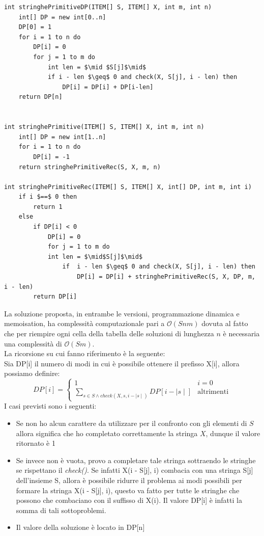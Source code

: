 \documentclass[../cheatSheetAlgoritmi.tex]{subfiles}
\begin{document}
\begin{lstlisting}[caption=Stringhe primitive]
int stringhePrimitiveDP(ITEM[] S, ITEM[] X, int m, int n)
	int[] DP = new int[0..n]
	DP[0] = 1
	for i = 1 to n do
		DP[i] = 0
		for j = 1 to m do
			int len = $\mid $S[j]$\mid$
			if i - len $\geq$ 0 and check(X, S[j], i - len) then
				DP[i] = DP[i] + DP[i-len]
	return DP[n]


int stringhePrimitive(ITEM[] S, ITEM[] X, int m, int n)
	int[] DP = new int[1..n]
	for i = 1 to n do
		DP[i] = -1
	return stringhePrimitiveRec(S, X, m, n)

int stringhePrimitiveRec(ITEM[] S, ITEM[] X, int[] DP, int m, int i)
	if i $==$ 0 then
		return 1
	else
		if DP[i] < 0 
			DP[i] = 0
			for j = 1 to m do
			int len = $\mid$S[j]$\mid$
				if  i - len $\geq$ 0 and check(X, S[j], i - len) then
					DP[i] = DP[i] + stringhePrimitiveRec(S, X, DP, m, i - len)
		return DP[i]		
\end{lstlisting}
La soluzione proposta, in entrambe le versioni, programmazione dinamica e memoisation, ha complessità computazionale pari a $\mathcal{O}(Snm)$ dovuta al fatto che per riempire ogni cella della tabella delle soluzioni di lunghezza $n$ è necessaria una complessità di $\mathcal{O}(Sm)$. \\
La ricorsione su cui fanno riferimento è la seguente: \\
Sia DP[i] il numero di modi in cui è possibile ottenere il prefisso X[i], allora possiamo definire: 
\begin{equation*}
  	DP[i] =\begin{cases}
        1 & \text{$i = 0$} \\ 
        \sum_{s \in S \land check(X, s, i - \mid s\mid)} DP[i - \mid s \mid] & \text{altrimenti}
  	\end{cases}
\end{equation*}
I casi previsti sono i seguenti:
\begin{itemize}
	\item Se non ho alcun carattere da utilizzare per il confronto con gli elementi di $S$ allora significa che ho completato correttamente la stringa $X$, dunque il valore ritornato è 1
	\item Se invece non è vuota, provo a completare tale stringa sottraendo le stringhe se rispettano il \emph{check()}. Se infatti X(i - S[j], i) combacia con una stringa S[j] dell'insieme S, allora è possibile ridurre il problema ai modi possibili per formare la stringa X(i - S[j], i), questo va fatto per tutte le stringhe che possono che combaciano con il suffisso di X(i). Il valore DP[i] è infatti la somma di tali sottoproblemi. 
	\item Il valore della soluzione è locato in DP[n]
\end{itemize}
\end{document}
